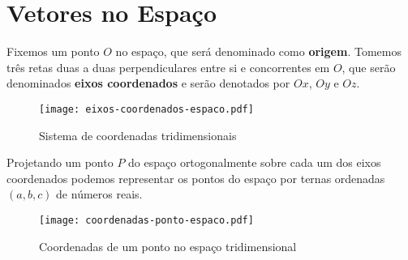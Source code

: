 
\chapter{Vetores no Espa\c{c}o} %
\label{cha:vetores_no_espaco}

Fixemos um ponto $O$ no espa\c{c}o, que ser\'a denominado como \textbf{origem}. Tomemos tr\^es retas duas a duas perpendiculares entre si e concorrentes em $O$, que ser\~ao denominados \textbf{eixos coordenados} e ser\~ao denotados por $Ox$, $Oy$ e $Oz$.
\begin{figure}[!h]
  \centering
  \caption{Sistema de coordenadas tridimensionais}
  \texttt{[image: eixos-coordenados-espaco.pdf]}
    
\end{figure}

Projetando um ponto $P$ do espa\c{c}o ortogonalmente sobre cada um dos eixos coordenados podemos representar os pontos do espa\c{c}o por ternas ordenadas $(a,b,c)$ de n\'umeros reais.

\begin{figure}[!h]
  \centering
  \caption{Coordenadas de um ponto no espa\c{c}o tridimensional}
  \texttt{[image: coordenadas-ponto-espaco.pdf]}
    


\end{figure}

